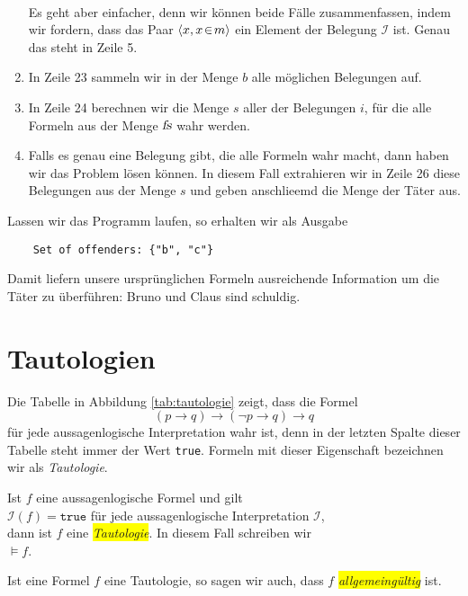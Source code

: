 \begin{enumerate}
      \\[0.2cm]
      Es geht aber einfacher, denn wir k\"{o}nnen beide F\"{a}lle zusammenfassen, indem wir fordern,
      dass das Paar $\pair(x, x \el m)$ ein Element der Belegung $\mathcal{I}$ ist. Genau
      das steht in Zeile 5.
\item In Zeile 23 sammeln wir in der Menge $b$ alle m\"{o}glichen Belegungen auf.
\item In Zeile 24 berechnen wir die Menge $s$ aller der Belegungen $i$, f\"{u}r die alle 
      Formeln aus der Menge $\textsl{fs}$ wahr werden. 
\item Falls es genau eine Belegung gibt, die alle Formeln wahr macht, 
      dann haben wir das Problem l\"{o}sen k\"{o}nnen.  In diesem Fall
      extrahieren wir in Zeile 26 diese Belegungen aus der Menge $s$ und geben
      anschlie\3emd die Menge der T\"{a}ter aus.
\end{enumerate}
Lassen wir das Programm laufen, so erhalten wir als Ausgabe
\begin{verbatim}
    Set of offenders: {"b", "c"}
\end{verbatim}
Damit liefern unsere urspr\"{u}nglichen Formeln ausreichende Information um die T\"{a}ter zu \"{u}berf\"{u}hren:
Bruno und Claus sind schuldig.


\section{Tautologien}
Die Tabelle in Abbildung \ref{tab:tautologie} zeigt, dass die Formel
$$  (p \rightarrow q) \rightarrow (\neg p \rightarrow q) \rightarrow q $$
f\"{u}r jede aussagenlogische Interpretation wahr ist, denn in der letzten Spalte dieser Tabelle steht immer der
Wert \texttt{true}.  Formeln mit dieser Eigenschaft  bezeichnen wir als \emph{Tautologie}.
\begin{Definition}[Tautologie]
  Ist $f$ eine aussagenlogische Formel und gilt \\[0.2cm]
  \hspace*{1.3cm} $\mathcal{I}(f) = \mathtt{true}$ \quad f\"{u}r jede aussagenlogische Interpretation $\mathcal{I}$, \\[0.2cm]
  dann ist $f$ eine \colorbox{yellow}{\emph{Tautologie}}.  In diesem Fall schreiben wir \\[0.2cm]
  \hspace*{1.3cm} $\models f$.
  \eox
\end{Definition}

\noindent
Ist eine Formel $f$ eine Tautologie, so sagen wir auch, dass $f$
\colorbox{yellow}{\emph{allgemeing\"{u}ltig}} ist.

